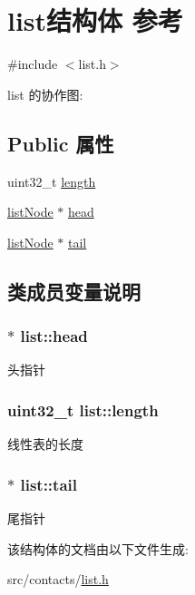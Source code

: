 \hypertarget{structlist}{}\section{list结构体 参考}
\label{structlist}


{\ttfamily \#include $<$list.\+h$>$}



list 的协作图\+:
\subsection*{Public 属性}
\begin{DoxyCompactItemize}
\item 
uint32\+\_\+t \hyperlink{structlist_aa550d94029ee5654b79d8f8b6935c0f0}{length}
\item 
\hyperlink{structlistNode}{list\+Node} $\ast$ \hyperlink{structlist_a231e615cc831876b01a16f23ee4bb320}{head}
\item 
\hyperlink{structlistNode}{list\+Node} $\ast$ \hyperlink{structlist_ad53539b1744468c6e2c231061bb9f0b1}{tail}
\end{DoxyCompactItemize}


\subsection{类成员变量说明}
\subsubsection[{\texorpdfstring{head}{head}}]{$\ast$ list\+::head}\hypertarget{structlist_a231e615cc831876b01a16f23ee4bb320}{}\label{structlist_a231e615cc831876b01a16f23ee4bb320}
头指针 
\subsubsection[{\texorpdfstring{length}{length}}]{\setlength{\rightskip}{0pt plus 5cm}uint32\+\_\+t list\+::length}\hypertarget{structlist_aa550d94029ee5654b79d8f8b6935c0f0}{}\label{structlist_aa550d94029ee5654b79d8f8b6935c0f0}
线性表的长度 
\subsubsection[{\texorpdfstring{tail}{tail}}]{$\ast$ list\+::tail}\hypertarget{structlist_ad53539b1744468c6e2c231061bb9f0b1}{}\label{structlist_ad53539b1744468c6e2c231061bb9f0b1}
尾指针 

该结构体的文档由以下文件生成\+:\begin{DoxyCompactItemize}
\item 
src/contacts/\hyperlink{list_8h}{list.\+h}\end{DoxyCompactItemize}
